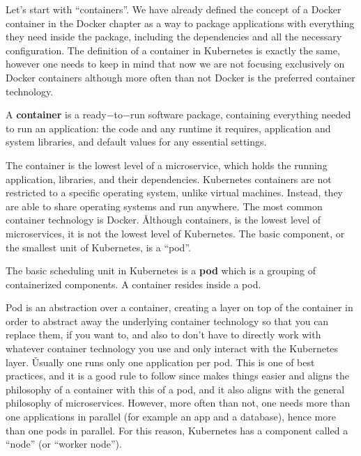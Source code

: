 Let's start with ``containers''. We have already defined the concept of a Docker container in the Docker chapter as a
way to package applications with everything they need inside the package, including the dependencies and all the
necessary configuration. The definition of a container in Kubernetes is exactly the same, however one needs to keep
in mind that now we are not focusing exclusively on Docker containers although more often than not Docker is the
preferred container technology.

\bd[Container]
A \textbf{container} is a ready$-$to$-$run software package, containing everything needed to run an application: the
code and any runtime it requires, application and system libraries, and default values for any essential settings.
\ed


The container is the lowest level of a microservice, which holds the running application, libraries, and their
dependencies. Kubernetes containers are not restricted to a specific operating system, unlike virtual machines.
Instead, they are able to share operating systems and run anywhere. The most common container technology is Docker. \v

Although containers, is the lowest level of microservices, it is not the lowest level of Kubernetes. The basic
component, or the smallest unit of Kubernetes, is a ``pod''.

\bd[Pod]
The basic scheduling unit in Kubernetes is a \textbf{pod} which is a grouping of containerized components. A container
resides inside a pod.
\ed


Pod is an abstraction over a container, creating a layer on top of the container in order to abstract away the
underlying container technology so that you can replace them, if you want to, and also to don't have to directly work
with whatever container technology you use and only interact with the Kubernetes layer. \v

Usually one runs only one application per pod. This is one of best practices, and it is a good rule to follow since
makes things easier and aligns the philosophy of a container with this of a pod, and it also aligns with the general
philosophy of microservices. However, more often than not, one needs more than one applications in parallel (for
example an app and a database), hence more than one pods in parallel. For this reason, Kubernetes has a component
called a ``node'' (or ``worker node'').

